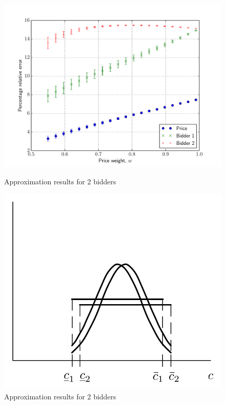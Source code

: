 \begin{figure}[p!]
  \includegraphics[width=\figsize]{Approximation/Figures/compare_2_bidders}
  \caption{Approximation results for 2 bidders}
  \label{fig:compare_2_bidders_approximation}
  \vspace{10mm}
  \includegraphics[width=\figsize]{Approximation/Figures/dmp_cp_w_1}
  \caption{Approximation results for 2 bidders}
  \label{fig:dmp_cp_w_1_approximation}
\end{figure}



